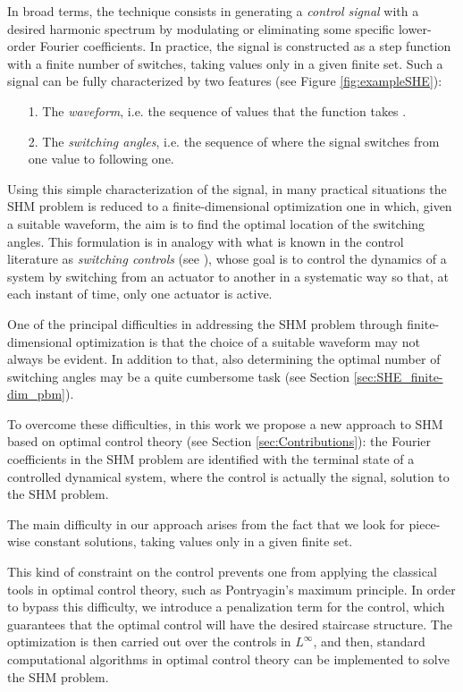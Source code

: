 \documentclass[twocolumn]{autart}    %
\begin{document}
In broad terms, the technique consists in generating a \textit{control signal} with a desired harmonic spectrum by modulating or eliminating some specific lower-order Fourier coefficients. In practice, the signal is constructed as a step function with a finite number of switches, taking values only in a given finite set. Such a signal can be fully characterized by two features (see Figure \ref{fig:exampleSHE}): 
\begin{itemize}
	\item[1.] The \textit{waveform}, i.e. the sequence of values that the function takes .
	\item[2.] The \textit{switching angles}, i.e. the sequence of  where the signal switches from one value to following one. 
\end{itemize}

Using this simple characterization of the signal, in many practical situations the SHM problem is reduced to a finite-dimensional optimization one in which, given a suitable waveform, the aim is to find the optimal location of the switching angles. This formulation is in analogy with what is known in the control literature as \textit{switching controls} (see \cite{Zuazua2011}), whose goal is to control the dynamics of a system by switching from an actuator to another in a systematic way so that, at each instant of time, only one actuator is active.

One of the principal difficulties in addressing the SHM problem through finite-dimensional optimization is that the choice of a suitable waveform may not always be evident. In addition to that, also determining the optimal number of switching angles may be a quite cumbersome task (see Section \ref{sec:SHE_finite-dim_pbm}).  

To overcome these difficulties, in this work we propose a new approach to SHM based on optimal control theory (see Section \ref{sec:Contributions}): the Fourier coefficients in the SHM problem are identified with the terminal state of a controlled dynamical system, where the control is actually the signal, solution to the SHM problem. 

The main difficulty in our approach arises from the fact that we look for piece-wise constant solutions, taking values only in a given finite set.

This kind of constraint on the control prevents one from applying the classical tools in optimal control theory, such as Pontryagin's maximum principle. In order to bypass this difficulty, we introduce a penalization term for the control, which guarantees that the optimal control will have the desired staircase structure. The optimization is then carried out over the controls in $L^\infty$, and then, standard computational algorithms in optimal control theory can be implemented to solve the SHM problem. 
\end{document}
